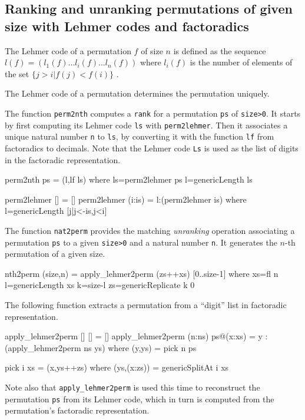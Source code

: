\documentclass[]{INCLUDES/llncs}
\begin{document}
\subsection{Ranking and unranking permutations of given size with Lehmer codes
and factoradics} 
The Lehmer code of a permutation $f$ of size $n$ is defined as the sequence
$l(f)=(l_1(f) \ldots l_i(f) \ldots l_n(f))$ 
where $l_i(f)$ is the number
of elements of the set $\{j>i|f(j)<f(i)\}$
\cite{DBLP:journals/dmtcs/MantaciR01}.
 \begin{prop}
 The Lehmer code of a permutation determines the permutation uniquely.
 \end{prop} 
The function {\tt perm2nth} computes a {\tt rank} 
for a permutation {\tt ps} of {\tt size>0}. 
It starts by first computing its Lehmer code {\tt ls} with 
{\tt perm2lehmer}. Then  it associates a unique natural 
number {\tt n} to {\tt ls}, 
by converting it with the function {\tt lf} 
from factoradics to decimals. 
Note that the Lehmer code {\tt Ls} is used as the list of digits
in the factoradic representation.
\begin{code}
perm2nth ps = (l,lf ls) where 
  ls=perm2lehmer ps
  l=genericLength ls

perm2lehmer [] = []
perm2lehmer (i:is) = l:(perm2lehmer is) where
  l=genericLength [j|j<-is,j<i]  
\end{code}

The function {\tt nat2perm} provides the matching {\em unranking}
operation associating a permutation {\tt ps} to a given {\tt size>0} 
and a natural number {\tt n}. It generates the $n$-th permutation of a given
size.
\begin{code}
nth2perm (size,n) = 
  apply_lehmer2perm (zs++xs) [0..size-1] where 
    xs=fl n
    l=genericLength xs
    k=size-l
    zs=genericReplicate k 0
\end{code}
The following function extracts 
a permutation from a ``digit'' list
in factoradic representation.
\begin{code}
apply_lehmer2perm [] [] = []
apply_lehmer2perm (n:ns) ps@(x:xs) = 
   y : (apply_lehmer2perm ns ys) where
   (y,ys) = pick n ps

pick i xs = (x,ys++zs) where 
  (ys,(x:zs)) = genericSplitAt i xs
\end{code}
\begin{comment}
\begin{code}
lehmer2perm ls = apply_lehmer2perm ls [0..(genericLength ls)-1]
\end{code}
\end{comment}
Note also that {\tt apply\_lehmer2perm} is used this time
to reconstruct the permutation {\tt ps} from its Lehmer code,
which in turn is computed from the permutation's 
factoradic representation.
\end{document}

